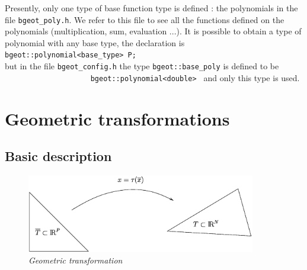 \documentclass[11pt,a4paper]{article}
\begin{document}
Presently, only one type of base function type is defined : the polynomials in the file {\tt bgeot\_poly.h}. We refer to this file to see all the functions defined on the polynomials (multiplication, sum, evaluation ...). It is possible to obtain a type of polynomial with any base type, the declaration is\\[0.5cm]
{\tt bgeot::polynomial<base\_type> P;}\\[0.5cm]
but in the file  {\tt bgeot\_config.h} the type  {\tt bgeot::base\_poly} is defined to be $\hspace{10em}$ {\tt bgeot::polynomial<double> } and only this type is used.

\section{Geometric transformations}
\subsection{Basic description}
\begin{figure}[htb]
  \begin{center}
    \includegraphics[width=10cm,angle=0]{getfemelem_trans.eps}
  \end{center}
  \caption{ \it Geometric transformation }
  \label{fig:transgeo}
\end{figure}
\end{document}

